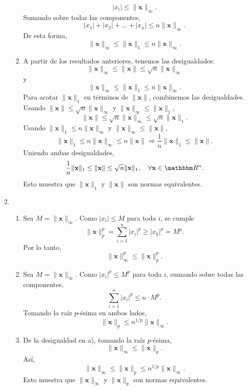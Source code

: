 \begin{enumerate}
\begin{enumerate}
        $$|x_i| \leq \|\mathbf{x}\|_{\infty}.$$
        Sumando sobre todas las componentes,
        $$|x_1| + |x_2| + \dots + |x_n| \leq n \|\mathbf{x}\|_{\infty}.$$
        De esta forma,
        $$\| \mathbf{x} \|_{\infty} \leq \| \mathbf{x} \|_1 \leq n \| \mathbf{x} \|_{\infty}.$$
        \item A partir de los resultados anteriores, tenemos las desigualdades:
        $$\|\mathbf{x}\|_{\infty} \leq \|\mathbf{x}\| \leq \sqrt{n} \|\mathbf{x}\|_{\infty}$$
        y
        $$\|\mathbf{x}\|_{\infty} \leq \|\mathbf{x}\|_1 \leq n \|\mathbf{x}\|_{\infty}.$$
        Para acotar $\|\mathbf{x}\|_1$ en términos de $\|\mathbf{x}\|$, combinemos las desigualdades. Usando $\| \mathbf{x} \| \leq \sqrt{n} \| \mathbf{x} \|_\infty$  y $\| \mathbf{x} \|_\infty \leq \| \mathbf{x} \|_1$,
        $$\| \mathbf{x} \| \leq \sqrt{n} \| \mathbf{x} \|_\infty \leq \sqrt{n} \| \mathbf{x} \|_1.$$
        Usando $\| \mathbf{x} \|_1 \leq n \| \mathbf{x} \|_\infty$ y $\| \mathbf{x} \|_\infty \leq \| \mathbf{x} \|$,
        $$\| \mathbf{x} \|_1 \leq n \| \mathbf{x} \|_\infty \leq n \| \mathbf{x} \| \Longrightarrow \frac{1}{n} \| \mathbf{x} \|_1 \leq \| \mathbf{x} \|.$$
        Uniendo ambas desigualdades,
        $$\frac{1}{n} \| \mathbf{x} \|_1 \leq \| \mathbf{x} \| \leq \sqrt{n} \| \mathbf{x} \|_1, \quad \forall \mathbf{x} \in \RR[n].$$
        Esto muestra que $\|\mathbf{x}\|_1$ y $\|\mathbf{x}\|$ son normas equivalentes.
    \end{enumerate}
    \item \begin{enumerate}
        \item Sea $M = \|\mathbf{x}\|_\infty$. Como $|x_i| \leq M$ para toda $i$, se cumple
        $$\|\mathbf{x}\|_p^p = \sum_{i=1}^n |x_i|^p \geq |x_k|^p = M^p.$$
        Por lo tanto,
        $$\|\mathbf{x}\|_{\infty}^p \leq \|\mathbf{x}\|_p^p.$$
        \item Sea $M = \|\mathbf{x}\|_{\infty}$. Como $|x_i|^p \leq M^p$ para toda $i$, sumando sobre todas las componentes,
        $$\sum_{i=1}^n |x_i|^p \leq n \cdot M^p.$$
        Tomando la raíz $p$-ésima en ambos lados,
        $$\| \mathbf{x} \|_p \leq n^{1/p} \| \mathbf{x} \|_{\infty}.$$
        \item De la desigualdad en a), tomando la raíz $p$-ésima,
        $$\|\mathbf{x}\|_{\infty} \leq \|\mathbf{x}\|_p.$$
        Así,
        $$\|\mathbf{x}\|_{\infty} \leq \|\mathbf{x}\|_p \leq n^{1/p} \|\mathbf{x}\|_{\infty}.$$
        Esto muestra que $\|\mathbf{x}\|_{\infty}$ y $\|\mathbf{x}\|_p$ son normas equivalentes.

\end{enumerate}
\end{enumerate}
